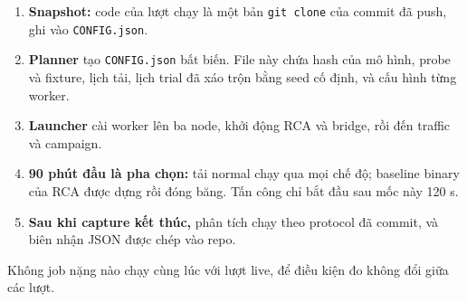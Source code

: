 \begin{enumerate}
\def\labelenumi{\arabic{enumi}.}
\tightlist
\item
  \textbf{Snapshot:} code của lượt chạy là một bản \texttt{git clone} của commit đã push, ghi vào \texttt{CONFIG.json}.
\item
  \textbf{Planner} tạo \texttt{CONFIG.json} bất biến. File này chứa hash của mô hình, probe và fixture, lịch tải, lịch trial đã xáo trộn bằng seed cố định, và cấu hình từng worker.
\item
  \textbf{Launcher} cài worker lên ba node, khởi động RCA và bridge, rồi đến traffic và campaign.
\item
  \textbf{90 phút đầu là pha chọn:} tải normal chạy qua mọi chế độ; baseline binary của RCA được dựng rồi đóng băng. Tấn công chỉ bắt đầu sau mốc này 120 s.
\item
  \textbf{Sau khi capture kết thúc,} phân tích chạy theo protocol đã commit, và biên nhận JSON được chép vào repo.
\end{enumerate}

Không job nặng nào chạy cùng lúc với lượt live, để điều kiện đo không đổi giữa các lượt.
